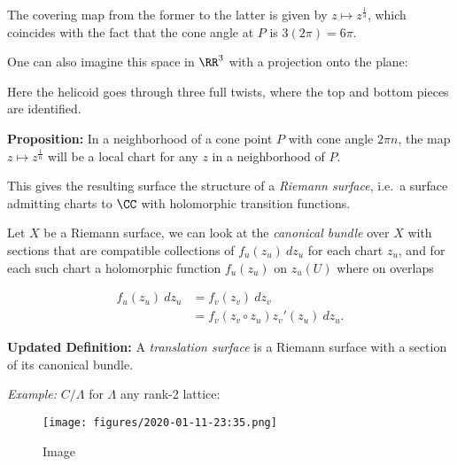 The covering map from the former to the latter is given by
\(z\mapsto z^{\frac 1 3}\), which coincides with the fact that the cone
angle at \(P\) is \(3(2\pi) = 6\pi\).

One can also imagine this space in \(\RR^3\) with a projection onto the
plane: \pgfplotsset{compat=1.16,width=10cm,height=14cm}

\begin{center}
\end{center}

Here the helicoid goes through three full twists, where the top and
bottom pieces are identified.

\textbf{Proposition:} In a neighborhood of a cone point \(P\) with cone
angle \(2\pi n\), the map \(z\mapsto z^{\frac 1 n}\) will be a local
chart for any \(z\) in a neighborhood of \(P\).

This gives the resulting surface the structure of a \emph{Riemann
surface}, i.e.~a surface admitting charts to \(\CC\) with holomorphic
transition functions.

Let \(X\) be a Riemann surface, we can look at the \emph{canonical
bundle} over \(X\) with sections that are compatible collections of
\(f_u(z_u) ~dz_u\) for each chart \(z_u\), and for each such chart a
holomorphic function \(f_u(z_u)\) on \(z_u(U)\) where on overlaps

\begin{align*}
f_u(z_u) ~dz_u &= f_v(z_v) ~dz_v \\
&= f_v(z_v \circ z_u) z_v'(z_u) ~dz_u
.\end{align*}

\textbf{Updated Definition:} A \emph{translation surface} is a Riemann
surface with a section of its canonical bundle.

\emph{Example:} \(C/\Lambda\) for \(\Lambda\) any rank-2 lattice:

\begin{figure}
\centering
\texttt{[image: figures/2020-01-11-23:35.png]}
\caption{Image}
\end{figure}

